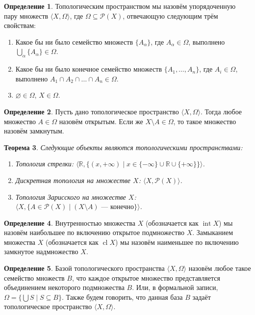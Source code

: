 \documentclass[a4paper,11pt]{article}
\newtheorem{thm}{Теорема}[section]
\theoremstyle{definition}
\newtheorem{dfn}[thm]{Определение}
\begin{document}
\begin{dfn}
Топологическим пространством мы назовём упорядоченную пару множеств
$\langle X, \Omega\rangle$, где $\Omega \subseteq \mathcal{P}(X)$, отвечающую
следующим трём свойствам:
\begin{enumerate}
\item Какое бы ни было семейство множеств $\{A_\alpha\}$, где
  $A_\alpha \in \Omega$, выполнено $\bigcup_\alpha \{A_\alpha\} \in \Omega$.
\item Какое бы ни было конечное семейство множеств $\{A_1, \dots, A_n\}$, где
  $A_i \in \Omega$, выполнено $A_1 \cap A_2 \cap \dots \cap A_n \in \Omega$.
\item $\varnothing \in \Omega$, $X \in \Omega$.
\end{enumerate}
\end{dfn}

\begin{dfn}
Пусть дано топологическое пространство $\langle X, \Omega\rangle$. Тогда любое
множество $A \in \Omega$ назовём открытым. Если же $X \setminus A \in \Omega$,
то такое множество назовём замкнутым.
\end{dfn}

\begin{thm}
Следующие объекты являются топологическими пространствами:
\begin{enumerate}
\item Топология стрелки:
  $\langle \mathbb{R}, \{(x, +\infty) \mid x \in \{-\infty\} \cup \mathbb{R} \cup \{+\infty\}\}\rangle$.
\item Дискретная топология на множестве $X$: $\langle X, \mathcal{P}(X)\rangle$.
\item Топология Зарисского на множестве $X$:
  $\langle X, \{A \in \mathcal{P}(X) \mid (X \setminus A) \text{ --- конечно}\}\rangle$.
\end{enumerate}
\end{thm}

\begin{dfn}
Внутренностью множества $X$ (обозначается как $\operatorname{int} X$) мы назовём
наибольшее по включению открытое подмножество $X$. Замыканием множества $X$
(обозначается как $\operatorname{cl} X$) мы назовём наименьшее по включению
замкнутое надмножество $X$.
\end{dfn}

\begin{dfn}
Базой топологического пространства $\langle X, \Omega\rangle$ назовём любое такое
семейство множеств $B$, что каждое открытое множество представляется
объединением некоторого подмножества $B$. Или, в формальной записи,
$\Omega = \{\bigcup S \mid S \subseteq B\}$. Также будем говорить, что данная
база $B$ задаёт топологическое пространство $\langle X, \Omega\rangle$.
\end{dfn}
\end{document}
